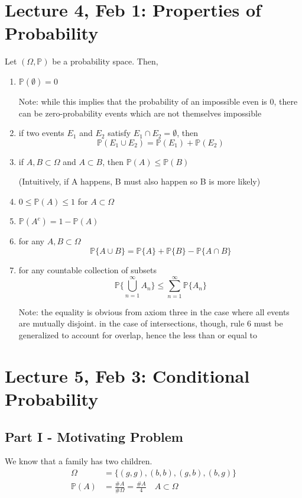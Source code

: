 \documentclass[12pt]{article}
\renewcommand{\P}{\mathbb{P}}
\begin{document}
\section*{Lecture 4, Feb 1: Properties of Probability}
Let $(\Omega, \P)$ be a probability space. Then,
\begin{enumerate}
    \item $\P(\emptyset) = 0$ 
    
    Note: while this implies that the probability of an impossible even is 0, there can be zero-probability events which are not themselves impossible
    \item if two events $E_1$ and $E_2$ satisfy $E_1 \cap E_2 = \emptyset$, then 
    \[\P(E_1 \cup E_2) = \P(E_1) + \P(E_2)\]

    \item if $A, B \subset \Omega$ and $A \subset B$, then $\P(A) \leq \P(B)$
    
    (Intuitively, if A happens, B must also happen so B is more likely)
    \item $0 \leq \P(A) \leq 1$ for $A \subset \Omega$
    \item $\P(A^c) = 1 - \P(A)$
    \item for any $A, B \subset \Omega$
    \[\P\{A \cup B\} = \P\{A\} + \P\{B\} - \P\{A \cap B\}\]
    \item for any countable collection of subsets
    \[\P\{\bigcup_{n=1}^\infty A_n \} \leq \sum_{n=1}^\infty \P\{A_n\}\]

    Note: the equality is obvious from axiom three in the case where all events are mutually disjoint. in the case of intersections, though, rule 6 must be generalized to account for overlap, hence the less than or equal to 
\end{enumerate}

\section{Lecture 5, Feb 3: Conditional Probability}
\subsection*{Part I - Motivating Problem} 
We know that a family has two children. 
\begin{align*}
    \Omega &= \{(g, g), (b, b), (g, b), (b, g)\}\\
    \P(A) &= \frac{\#A}{\#\Omega} = \frac{\#A}{4}\quad A \subset \Omega
\end{align*}
\end{document}
